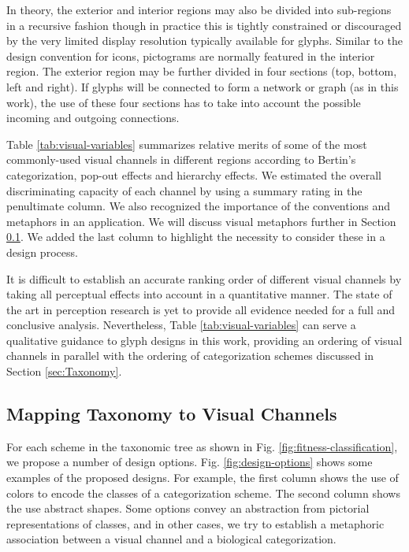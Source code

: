 In theory, the exterior and interior regions may also be divided into sub-regions in a recursive fashion though in practice this is tightly constrained or discouraged by the very limited display resolution typically available for glyphs.
Similar to the design convention for icons, pictograms are normally featured in the interior region.
The exterior region may be further divided in four sections (top, bottom, left and right).
If glyphs will be connected to form a network or graph (as in this work), the use of these four sections has to take into account the possible incoming and outgoing connections.

Table \ref{tab:visual-variables} summarizes relative merits of some of the most commonly-used visual channels in different regions according to Bertin's categorization, pop-out effects and hierarchy effects.
We estimated the overall discriminating capacity of each channel by using a summary rating in the penultimate column.
We also recognized the importance of the conventions and metaphors in an application.
We will discuss visual metaphors further in Section \ref{sec:Mapping}.
We added the last column to highlight the necessity to consider these in a design process.

It is difficult to establish an accurate ranking order of different visual channels by taking all perceptual effects into account in a quantitative manner.
The state of the art in perception research is yet to provide all evidence needed for a full and conclusive analysis.
Nevertheless, Table \ref{tab:visual-variables} can serve a qualitative guidance to glyph designs in this work, providing an ordering of visual channels in parallel with the ordering of categorization schemes discussed in Section \ref{sec:Taxonomy}.

\subsection{Mapping Taxonomy to Visual Channels}
\label{sec:Mapping}

For each scheme in the taxonomic tree as shown in Fig. \ref{fig:fitness-classification}, we propose a number of design options.
Fig. \ref{fig:design-options} shows some examples of the proposed designs.
For example, the first column shows the use of colors to encode the classes of a categorization scheme.
The second column shows the use abstract shapes.
Some options convey an abstraction from pictorial representations of classes, and in other cases, we try to establish a metaphoric association between a visual channel and a biological categorization. 

